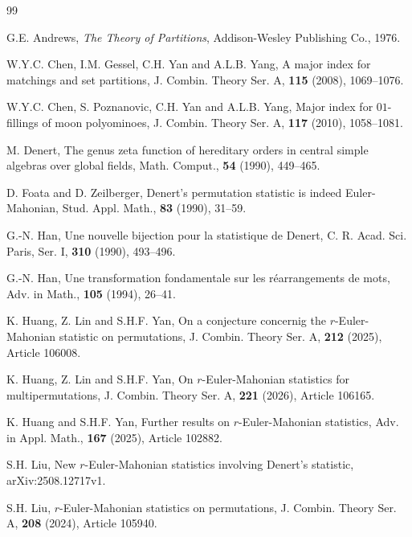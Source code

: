 \documentclass[12pt]{article}
\numberwithin{equation}{section}
\theoremstyle{plain}
\begin{document}
	
	\begin{thebibliography}{99}
		
		G.E. Andrews, {\it The Theory of Partitions}, Addison-Wesley Publishing Co., 1976.
		
	 W.Y.C. Chen,   I.M. Gessel,  C.H. Yan and A.L.B. Yang,
	 A major index for matchings and set partitions,  J. Combin. Theory Ser. A, {\bf 115} (2008),  1069--1076.
	 
	 W.Y.C. Chen,   S. Poznanovic,  C.H. Yan and A.L.B. Yang,
	 Major index for $01$-fillings of moon polyominoes,  J. Combin. Theory Ser. A, {\bf 117} (2010),  1058--1081.
	 
		M. Denert, The genus zeta function of hereditary orders in central simple algebras over global fields, Math. Comput., {\bf 54} (1990),   449--465.
		
	
	
		D. Foata and D. Zeilberger,
		Denert's permutation statistic is indeed Euler-Mahonian, 
		Stud. Appl. Math., {\bf 83} (1990),  31--59.
		
		G.-N. Han, 
		Une nouvelle bijection pour la statistique de Denert, 
		C. R. Acad. Sci. Paris, Ser. I, {\bf  310} (1990), 493--496.
		
		G.-N. Han, Une transformation fondamentale sur les r\'earrangements de mots, Adv. in Math., {\bf 105} (1994), 26--41. 
		
		K. Huang, Z. Lin and S.H.F. Yan, On a conjecture concernig the $r$-Euler-Mahonian statistic on permutations, J. Combin. Theory Ser. A, {\bf 212} (2025), Article 106008. 
		
		K. Huang, Z. Lin and S.H.F. Yan,   On $r$-Euler-Mahonian statistics for multipermutations,   J. Combin. Theory Ser. A, {\bf 221} (2026), Article 106165. 
		
		
		K. Huang and S.H.F. Yan, Further results on  $r$-Euler-Mahonian statistics,  Adv. in Appl. Math.,  {\bf 167} (2025), Article 102882.   
		
	 
		
		
		S.H. Liu, New $r$-Euler-Mahonian statistics involving Denert's statistic,  arXiv:2508.12717v1.  
		
		S.H. Liu,  $r$-Euler-Mahonian statistics on permutations,    J. Combin. Theory Ser. A,  {\bf 208} (2024),  Article  105940.
		

\end{thebibliography}
\end{document}
